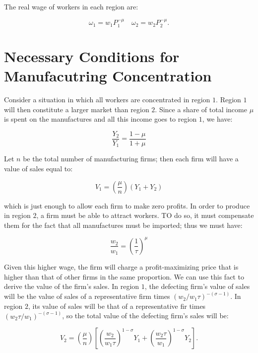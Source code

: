 The real wage of workers in each region are:

\begin{equation}
  \omega_1 = w_1 P_1^{-\mu} \quad \omega_2 = w_2 P_2^{-\mu}.
\end{equation}

\section{Necessary Conditions for Manufacutring Concentration}

Consider a situation in which all workers are concentrated in region $1$. Region $1$ will then constitute a larger market than region $2$. Since a share of total income $\mu$ is spent on the manufactures and all this income goes to region $1$, we have:

\begin{equation}
  \frac{Y_2}{Y_1} = \frac{1 - \mu}{1  +\mu}
\end{equation}

Let $n$ be the total number of manufacturing firms; then each firm will have a value of sales equal to:

\begin{equation}
  V_1 = (\frac{\mu}{n}) (Y_1 + Y_2)
\end{equation}

which is just enough to allow each firm to make zero profits. In order to produce in region $2$, a firm must be able to attract workers. TO do so, it must compensate them for the fact that all manufactures must be imported; thus we must have:

\begin{equation}
  \frac{w_2}{w_1} = (\frac{1}{\tau})^{\mu}
\end{equation}

Given this higher wage, the firm will charge a profit-maximizing price that is higher than that of other firms in the same proportion. We can use this fact to derive the value of the firm's sales. In region $1$, the defecting firm's value of sales will be the value of sales of a representative firm times $(w_2/w_1 \tau)^{-(\sigma - 1)}$. In region $2$, its value of sales will be that of a representative fir times $(w_2\tau / w_1)^{-(\sigma - 1)}$, so the total value of the defecting firm's sales will be:

\begin{equation}
  V_2 = (\frac{\mu}{n}) \left[ (\frac{w_2}{w_1 \tau})^{1 - \sigma}Y_1 + (\frac{w_2 \tau}{w_1})^{1 - \sigma}Y_2 \right].
\end{equation}

